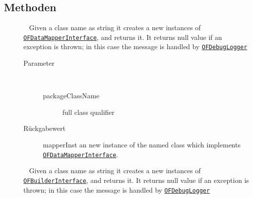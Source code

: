 \subsection{Methoden}
\begin{description}
\item[{\label{ontologyFramework.OFRunning.OFInvokingManager.ReflactionInstanciater.instanciateOFDataMapperByName(java.lang.String)}}]
~ Given a class name as string it creates a new instances of \texttt{\hyperlink{ontologyFramework.OFDataMapping.OFDataMapperInterface<OntoEntity extends org.semanticweb.owlapi.model.OWLObject, R>-class}{OFDataMapperInterface}},
 and returns it. It returns null value if an exception is thrown; in this case the message is 
 handled by \texttt{\hyperlink{ontologyFramework.OFErrorManagement.OFDebugLogger-class}{OFDebugLogger}}
\begin{description}
\item[Parameter] ~
\begin{description}
\item[packageClassName]
full class qualifier
\end{description}
\item[Rückgabewert] 
mapperInst an new instance of the named class which implements \texttt{\hyperlink{ontologyFramework.OFDataMapping.OFDataMapperInterface<OntoEntity extends org.semanticweb.owlapi.model.OWLObject, R>-class}{OFDataMapperInterface}}.
\end{description}
\item[{\label{ontologyFramework.OFRunning.OFInvokingManager.ReflactionInstanciater.instanciateOFBuilderByName(java.lang.String)}}]
~ Given a class name as string it creates a new instances of \texttt{\hyperlink{ontologyFramework.OFRunning.OFInitialising.OFBuilderInterface<T>-class}{OFBuilderInterface}},
 and returns it. It returns null value if an exception is thrown; in this case the message is 
 handled by \texttt{\hyperlink{ontologyFramework.OFErrorManagement.OFDebugLogger-class}{OFDebugLogger}}
\begin{description}

\end{description}
\end{description}
